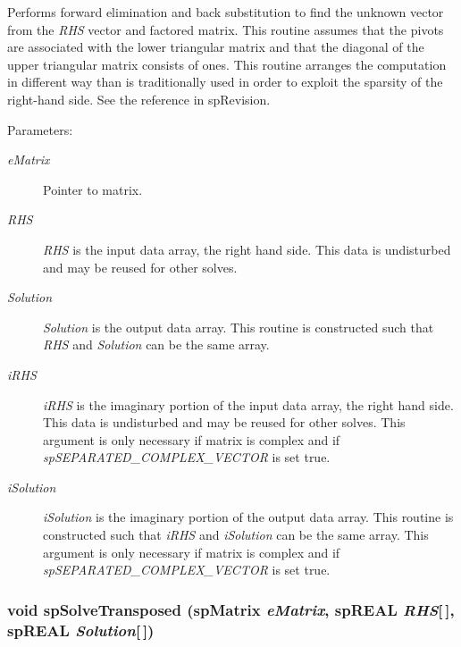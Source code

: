 Performs forward elimination and back substitution to find the unknown vector from the {\em RHS} vector and factored matrix. This routine assumes that the pivots are associated with the lower triangular matrix and that the diagonal of the upper triangular matrix consists of ones. This routine arranges the computation in different way than is traditionally used in order to exploit the sparsity of the right-hand side. See the reference in sp\-Revision.\begin{Desc}
\item[Parameters: ]\par
\begin{description}
\item[{\em 
e\-Matrix}]Pointer to matrix. \item[{\em 
RHS}]{\em RHS} is the input data array, the right hand side. This data is undisturbed and may be reused for other solves. \item[{\em 
Solution}]{\em Solution} is the output data array. This routine is constructed such that {\em RHS} and {\em Solution} can be the same array. \item[{\em 
i\-RHS}]{\em i\-RHS} is the imaginary portion of the input data array, the right hand side. This data is undisturbed and may be reused for other solves. This argument is only necessary if matrix is complex and if {\em sp\-SEPARATED\_\-COMPLEX\_\-VECTOR} is set true. \item[{\em 
i\-Solution}]{\em i\-Solution} is the imaginary portion of the output data array. This routine is constructed such that {\em i\-RHS} and {\em i\-Solution} can be the same array. This argument is only necessary if matrix is complex and if {\em sp\-SEPARATED\_\-COMPLEX\_\-VECTOR} is set true. \end{description}
\end{Desc}
\subsubsection{\setlength{\rightskip}{0pt plus 5cm}void sp\-Solve\-Transposed ({\bf sp\-Matrix} {\em e\-Matrix}, sp\-REAL {\em RHS}[$\,$], sp\-REAL {\em Solution}[$\,$])}\label{spSolve_8c_a6}


